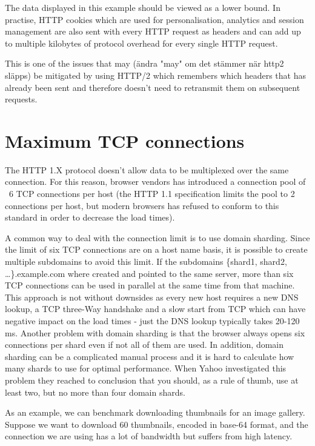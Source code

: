 \documentclass{cslthse-msc}
\begin{document}
The data displayed in this example should be viewed as a lower bound. In practise, HTTP cookies which are used for personalisation, analytics and session management are also sent with every HTTP request as headers and can add up to multiple kilobytes of protocol overhead for every single HTTP request\cite[page 200]{HPBN}.

This is one of the issues that may (ändra "may" om det stämmer när http2 släpps) be mitigated by using HTTP/2 which remembers which headers that has already been sent and therefore doesn't need to retransmit them on subsequent requests\cite[page 222]{HPBN}.

\section{Maximum TCP connections}
\label{max_tcp}
The HTTP 1.X protocol doesn't allow data to be multiplexed over the same connection\cite[p.194]{HPBN}. For this reason, browser vendors has introduced a connection pool of ~6 TCP connections per host (the HTTP 1.1 specification limits the pool to 2 connections\cite{rfc2616} per host, but modern browsers has refused to conform to this standard in order to decrease the load times).

A common way to deal with the connection limit is to use domain sharding. Since the limit of six TCP connections are on a host name basis, it is possible to create multiple subdomains to avoid this limit. If the subdomains \{shard1, shard2, \ldots\}.example.com where created and pointed to the same server, more than six TCP connections can be used in parallel at the same time from that machine. This approach is not without downsides as every new host requires a new DNS lookup, a TCP three-Way handshake and a slow start from TCP which can have negative impact on the load times\cite[page 199]{HPBN} - just the DNS lookup typically takes 20-120 ms\cite[page 63]{HPWS}. Another problem with domain sharding is that the browser always opens six connections per shard even if not all of them are used. In addition, domain sharding can be a complicated manual process and it is hard to calculate how many shards to use for optimal performance. When Yahoo investigated this problem they reached to conclusion that you should, as a rule of thumb, use at least two, but no more than four domain shards\cite{yahoo-performance-4}.

As an example, we can benchmark downloading thumbnails for an image gallery. Suppose we want to download 60 thumbnails, encoded in base-64 format, and the connection we are using has a lot of bandwidth but suffers from high latency.
\end{document}
